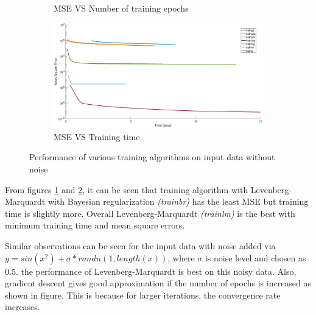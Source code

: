 \begin{figure}
\begin{subfigure}[b]{0.33\textwidth}
 		\caption{MSE VS Number of training epochs}\label{fig:mse_1}
 	\end{subfigure}%
	 \begin{subfigure}[b]{0.33\textwidth}
 		\centering
 		\captionsetup{width=0.8\linewidth, format = hang}
 		\includegraphics[height = 0.7\textwidth,width = 1\textwidth]{Exercise1/Report/mse_2}
 		\caption{MSE VS Training time \newline}\label{fig:mse_2}
 	\end{subfigure}
 	\captionsetup{format = hang}
 	\caption{Performance of various training algorithms on input data without noise}
 	\label{fig:train_perf}
\end{figure}
From figures \ref{fig:mse_1} and \ref{fig:mse_2}, it can be seen that training algorithm with Levenberg-Marquardt with Bayesian regularization \textit{(trainbr)} has the least MSE but training time is slightly more. Overall Levenberg-Marquardt \textit{(trainlm)} is the best with minimum training time and mean square errors.  

Similar observations can be seen for the input data with noise added via $y=sin(x^2)+\sigma*randn(1,length(x))$, where $\sigma$ is noise level and chosen as 0.5. the performance of Levenberg-Marquardt is best on this noisy data. Also, gradient descent gives good approximation if the number of epochs is increased as shown in figure. This is because for larger iterations, the convergence rate increases.

